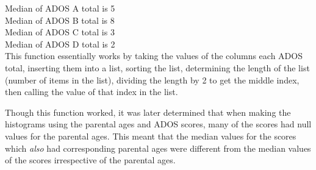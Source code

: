 \documentclass{article}
\begin{document}
Median of ADOS A total is 5\\
Median of ADOS B total is 8\\
Median of ADOS C total is 3\\
Median of ADOS D total is 2\\

This function essentially works by taking the values of the columns each ADOS total, inserting them into a list, sorting the list, determining the length of the list (number of items in the list), dividing the length by 2 to get the middle index, then calling the value of that index in the list. 

Though this function worked, it was later determined that when making the histograms using the parental ages and ADOS scores, many of the scores had null values for the parental ages. This meant that the median values for the scores which \textit{also} had corresponding parental ages were different from the median values of the scores irrespective of the parental ages. 
\end{document}
